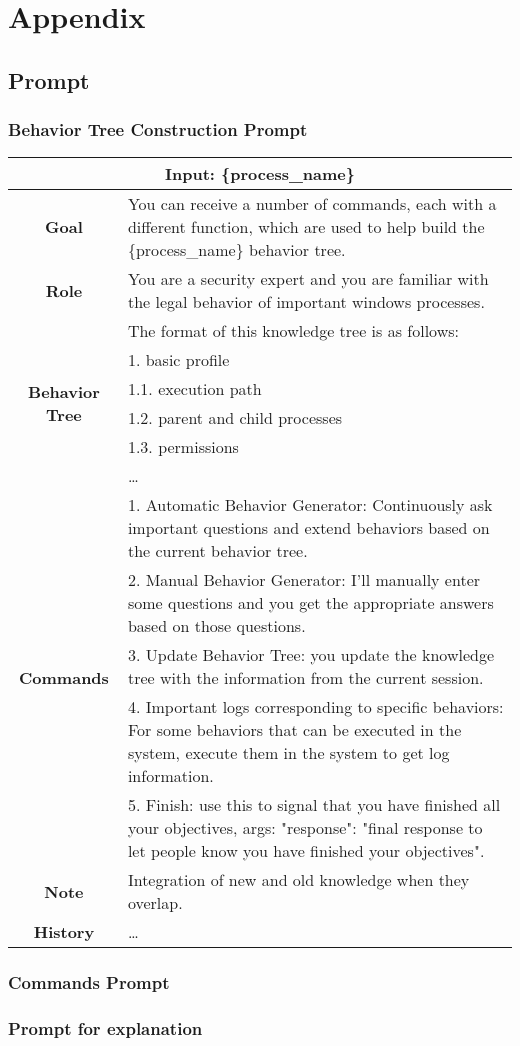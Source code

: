 \section{Appendix}

\subsection{Prompt}

\subsubsection{Behavior Tree Construction Prompt}
\begin{tabularx}{\textwidth}{|c|X|}
\hline
\multicolumn{2}{|c|}{\textbf{Input:} \{process\_name\}} \\
\hline
\textbf{Goal} & You can receive a number of commands, each with a different function, which are used to help build the \{process\_name\} behavior tree. \\
\hline
\textbf{Role} & You are a security expert and you are familiar with the legal behavior of important windows processes. \\
\hline
\multirow{6}{*}{\textbf{Behavior Tree}} & The format of this knowledge tree is as follows: \\
& 1. basic profile \\
& 1.1. execution path \\
& 1.2. parent and child processes \\
& 1.3. permissions \\
& \dots \\
\hline
\multirow{5}{*}{\textbf{Commands}} & 1. Automatic Behavior Generator: Continuously ask important questions and extend behaviors based on the current behavior tree. \\
& 2. Manual Behavior Generator: I'll manually enter some questions and you get the appropriate answers based on those questions. \\
& 3. Update Behavior Tree: you update the knowledge tree with the information from the current session. \\
& 4. Important logs corresponding to specific behaviors: For some behaviors that can be executed in the system, execute them in the system to get log information. \\
& 5. Finish: use this to signal that you have finished all your objectives, args: "response": "final response to let people know you have finished your objectives". \\
\hline
\textbf{Note} & Integration of new and old knowledge when they overlap. \\
\hline
\textbf{History} & \dots \\
\hline
\end{tabularx}

\subsubsection{Commands Prompt}

\subsubsection{Prompt for explanation}


